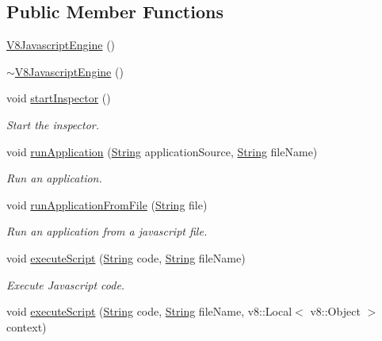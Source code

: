 \subsection*{Public Member Functions}
\begin{DoxyCompactItemize}
\item 
\mbox{\hyperlink{class_rad_j_a_v_1_1_v8_javascript_engine_ae042dd701a9a521642c2b3daffd7b016}{V8\+Javascript\+Engine}} ()
\item 
\mbox{\hyperlink{class_rad_j_a_v_1_1_v8_javascript_engine_a067369088e8eb2727ed8816d949868a7}{$\sim$\+V8\+Javascript\+Engine}} ()
\item 
void \mbox{\hyperlink{class_rad_j_a_v_1_1_v8_javascript_engine_a85fca2239b08a4c600e5f1269dabf948}{start\+Inspector}} ()
\begin{DoxyCompactList}\small\item\em Start the inspector. \end{DoxyCompactList}\item 
void \mbox{\hyperlink{class_rad_j_a_v_1_1_v8_javascript_engine_af792154ac1ceaa6c65faf2409cea5014}{run\+Application}} (\mbox{\hyperlink{class_rad_j_a_v_1_1_string}{String}} application\+Source, \mbox{\hyperlink{class_rad_j_a_v_1_1_string}{String}} file\+Name)
\begin{DoxyCompactList}\small\item\em Run an application. \end{DoxyCompactList}\item 
void \mbox{\hyperlink{class_rad_j_a_v_1_1_v8_javascript_engine_aa0d9d2f20abcf434f8986f7417ebcc3e}{run\+Application\+From\+File}} (\mbox{\hyperlink{class_rad_j_a_v_1_1_string}{String}} file)
\begin{DoxyCompactList}\small\item\em Run an application from a javascript file. \end{DoxyCompactList}\item 
void \mbox{\hyperlink{class_rad_j_a_v_1_1_v8_javascript_engine_ac45d45c9a25fe8f0f9e90fe21e8ef035}{execute\+Script}} (\mbox{\hyperlink{class_rad_j_a_v_1_1_string}{String}} code, \mbox{\hyperlink{class_rad_j_a_v_1_1_string}{String}} file\+Name)
\begin{DoxyCompactList}\small\item\em Execute Javascript code. \end{DoxyCompactList}\item 
void \mbox{\hyperlink{class_rad_j_a_v_1_1_v8_javascript_engine_a6b6b18af2efefb9c3025310f02ab9596}{execute\+Script}} (\mbox{\hyperlink{class_rad_j_a_v_1_1_string}{String}} code, \mbox{\hyperlink{class_rad_j_a_v_1_1_string}{String}} file\+Name, v8\+::\+Local$<$ v8\+::\+Object $>$ context)

\end{DoxyCompactItemize}
